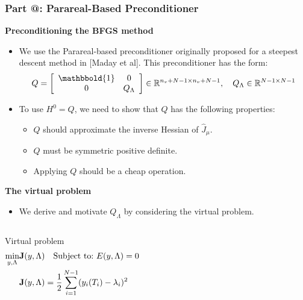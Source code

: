 \documentclass[9pt]{beamer}
\makeatletter
\newcommand*{\rom}[1]{\expandafter\@slowromancap\romannumeral #1@}
\makeatother
\begin{document}
\begin{frame}
\frametitle{\textbf{ Part \rom{3}:} Parareal-Based Preconditioner}
\textbf{Preconditioning the BFGS method}
\begin{itemize}
\item{We use the Parareal-based preconditioner originally proposed for a steepest descent method in [Maday et al]. This preconditioner has the form: {\small
\begin{align*}
Q = \left[ \begin{array}{cc}
	\mathbbold{1} & 0 \\
	0 & Q_{\Lambda} \\
	\end{array} \right]\in \mathbb{R}^{n_v+N-1\times n_v+N-1},\quad Q_{\Lambda}\in\mathbb{R}^{N-1\times N-1}
\end{align*}}}
\item<1->{To use $H^0=Q$, we need to show that $Q$ has the following properties:\begin{itemize}
\item<1->[1.]{$Q$ should approximate the inverse Hessian of $\hat J_{\mu}$.}
\item<1->[2.]{$Q$ must be symmetric positive definite.}
\item<1->[3.]{Applying $Q$ should be a cheap operation.}
\end{itemize}
}
\end{itemize}
\textbf{The virtual problem}
\begin{itemize}
\item{We derive and motivate $Q_{\Lambda}$ by considering the virtual problem.}
\end{itemize}
\begin{columns}
\begin{block}{Virtual problem}
{\small\begin{align*}
\min_{y,\Lambda}&\bold J(y,\Lambda)\quad \textrm{Subject to:}\ E(y,\Lambda)=0 \\
&\bold J(y,\Lambda)=\frac{1}{2}\sum_{i=1}^{N-1}(y_i(T_i)-\lambda_i)^2
\end{align*}}
\end{block}
\end{columns}
\end{frame}
\end{document}
